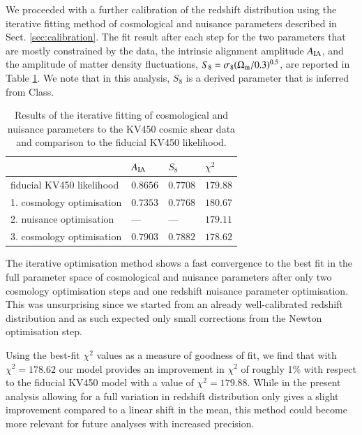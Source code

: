 \documentclass{aa}
\begin{document}
We proceeded with a further calibration of the redshift distribution using the iterative fitting method of cosmological and nuisance parameters described in Sect. \ref{sec:calibration}. The fit result after each step for the two parameters that are mostly constrained by the data, the intrinsic alignment amplitude $A_{\rm IA}$, and the amplitude of matter density fluctuations, $S_8 = \sigma_8(\Omega_{\rm m}/0.3)^{0.5}$, are reported in Table \ref{tab:iterative_calibration}. We note that in this analysis, $S_8$ is a derived parameter that is inferred from {\sc Class}. 
\begin{table}
\caption{Results of the iterative fitting of cosmological and nuisance parameters to the KV450 cosmic shear data and comparison to the fiducial KV450 likelihood.}
\centering
\begin{tabular}{llll}
\hline\hline
& $A_{\rm IA}$ & $S_8$ & $\chi^2$\\
\hline
fiducial KV450 likelihood & $0.8656$  & $0.7708$ & $179.88$\\
\hline
1. cosmology optimisation & $0.7353$  & $0.7768$ & $180.67$\\
2. nuisance optimisation & ---  & --- & $179.11$\\
3. cosmology optimisation & $0.7903$  & $0.7882$ & $178.62$\\
\end{tabular}
\label{tab:iterative_calibration}
\end{table}
The iterative optimisation method shows a fast convergence to the best fit in the full parameter space of cosmological and nuisance parameters after only two cosmology optimisation steps and one redshift nuisance parameter optimisation. This was unsurprising since we started from an already well-calibrated redshift distribution and as such expected only small corrections from the Newton optimisation step. 

Using the best-fit $\chi^2$ values as a measure of goodness of fit, we find that with $\chi^2 = 178.62$ our model provides an improvement in $\chi^2$ of roughly 1\% with respect to the fiducial KV450 model with a value of $\chi^2 = 179.88$. While in the present analysis allowing for a full variation in redshift distribution only gives a slight improvement compared to a linear shift in the mean, this method could become more relevant for future analyses with increased precision.%
\end{document}
